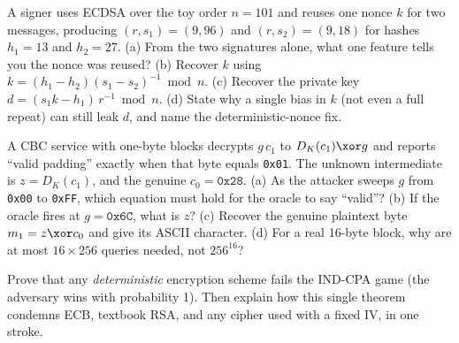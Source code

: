 \begin{exercise}
\label{ch38:ex-ecdsa-ex}
A signer uses ECDSA over the toy order $n = 101$ and reuses one nonce $k$ for two messages, producing $(r, s_1) = (9, 96)$ and $(r, s_2) = (9, 18)$ for hashes $h_1 = 13$ and $h_2 = 27$. (a) From the two signatures alone, what one feature tells you the nonce was reused? (b) Recover $k$ using $k = (h_1 - h_2)(s_1 - s_2)^{-1} \bmod n$. (c) Recover the private key $d = (s_1 k - h_1)\,r^{-1} \bmod n$. (d) State why a single bias in $k$ (not even a full repeat) can still leak $d$, and name the deterministic-nonce fix.
\end{exercise}

\begin{exercise}
\label{ch38:ex-padding-num-ex}
A CBC service with one-byte blocks decrypts $g\,c_1$ to $D_K(c_1)\xor g$ and reports ``valid padding'' exactly when that byte equals \texttt{0x01}. The unknown intermediate is $z = D_K(c_1)$, and the genuine $c_0 = \texttt{0x28}$. (a) As the attacker sweeps $g$ from \texttt{0x00} to \texttt{0xFF}, which equation must hold for the oracle to say ``valid''? (b) If the oracle fires at $g = \texttt{0x6C}$, what is $z$? (c) Recover the genuine plaintext byte $m_1 = z \xor c_0$ and give its ASCII character. (d) For a real 16-byte block, why are at most $16\times 256$ queries needed, not $256^{16}$?
\end{exercise}

\begin{exercise}
\label{ch38:ex-det}
Prove that any \emph{deterministic} encryption scheme fails the IND-CPA game (the adversary wins with probability 1). Then explain how this single theorem condemns ECB, textbook RSA, and any cipher used with a fixed IV, in one stroke.
\end{exercise}
